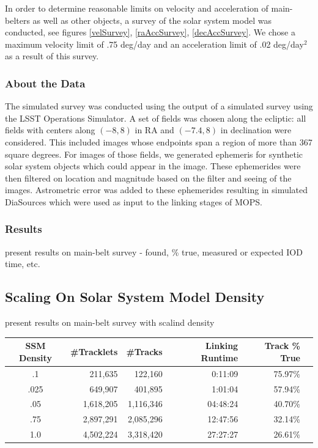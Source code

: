 \documentclass[12pt,preprint]{aastex}
\begin{document}
In order to determine reasonable limits on velocity and acceleration
of main-belters as well as other objects, a survey of the solar system
model \citep{Grav2011} was conducted, see figures \ref{velSurvey}, \ref{raAccSurvey}, \ref{decAccSurvey}.  We
chose a maximum velocity limit of .75 deg/day and an acceleration
limit of .02 deg/day$^2$ as a result of this survey.

\subsubsection{About the Data}

The simulated survey was conducted using the output of a simulated
survey using the LSST Operations Simulator.  A set of fields was
chosen along the ecliptic: all fields with centers along $(-8, 8)$ in
RA and $(-7.4, 8)$ in declination were considered.  This included
images whose endpoints span a region of more than 367 square
degrees. For images of those fields, we generated ephemeris for
synthetic solar system objects which could appear in the image.  These
ephemerides were then filtered on location and magnitude based on the
filter and seeing of the images.  Astrometric error was added to these
ephemerides resulting in simulated DiaSources which were used as input
to the linking stages of MOPS.


\subsubsection{Results}



present results on main-belt survey - found, \% true, measured or expected IOD time, etc.

\subsection{Scaling On Solar System Model Density}

present results on main-belt survey with scalind density

\begin{tabular}{|c|r|r|r|r|r|}
  \hline 
  SSM Density & \#Tracklets & \#Tracks & Linking Runtime & Track \% True  \\
  \hline
  .1         &   211,635    & 122,160   & 0:11:09            & 75.97\%   \\
  .025       &   649,907    & 401,895   & 1:01:04            & 57.94\%   \\
  .05        & 1,618,205    & 1,116,346 & 04:48:24           & 40.70\%   \\
  .75        & 2,897,291    & 2,085,296 & 12:47:56           & 32.14\%   \\
  1.0        & 4,502,224    & 3,318,420 & 27:27:27           & 26.61\%   \\
  \hline
\end{tabular}
\end{document}
